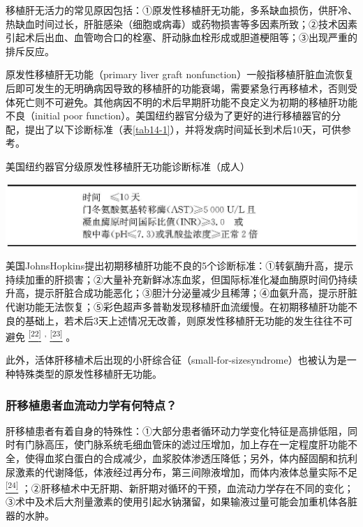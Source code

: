 移植肝无活力的常见原因包括：①原发性移植肝无功能，多系缺血损伤，供肝冷、热缺血时间过长，肝脏感染（细胞或病毒）或药物损害等多因素所致；②技术因素引起术后出血、血管吻合口的栓塞、肝动脉血栓形成或胆道梗阻等；③出现严重的排斥反应。

原发性移植肝无功能（primary liver graft
nonfunction）一般指移植肝脏血流恢复后即可发生的无明确病因导致的移植肝的功能衰竭，需要紧急行再移植术，否则受体死亡则不可避免。其他病因不明的术后早期肝功能不良定义为初期的移植肝功能不良（initial
poor
function）。美国纽约器官分级为了更好的进行移植器官的分配，提出了以下诊断标准（表\ref{tab14-1}），并将发病时间延长到术后10天，可供参考。

\begin{table}[htbp]
\centering
\caption{美国纽约器官分级原发性移植肝无功能诊断标准（成人）}
\label{tab14-1}
\includegraphics{./images/Image00109.jpg}
\end{table}

美国JohnsHopkins提出初期移植肝功能不良的5个诊断标准：①转氨酶升高，提示持续加重的肝损害；②大量补充新鲜冰冻血浆，但国际标准化凝血酶原时间仍持续升高，提示肝脏合成功能恶化；③胆汁分泌量减少且稀薄；④血氨升高，提示肝脏代谢功能无法恢复；⑤彩色超声多普勒发现移植肝血流缓慢。在初期移植肝功能不良的基础上，若术后3天上述情况无改善，则原发性移植肝无功能的发生往往不可避免
\protect\hyperlink{text00020.htmlux5cux23ch22-19}{\textsuperscript{{[}22{]}}}
\textsuperscript{,}
\protect\hyperlink{text00020.htmlux5cux23ch23-19}{\textsuperscript{{[}23{]}}}
。

此外，活体肝移植术后出现的小肝综合征（small-for-sizesyndrome）也被认为是一种特殊类型的原发性移植肝无功能。

\subsubsection{肝移植患者血流动力学有何特点？}

肝移植患者有着自身的特殊性：①大部分患者循环动力学变化特征是高排低阻，同时有门脉高压，使门脉系统毛细血管床的滤过压增加，加上存在一定程度肝功能不全，使得血浆白蛋白的合成减少，血浆胶体渗透压降低；另外，体内醛固酮和抗利尿激素的代谢降低，体液经过再分布，第三间隙液增加，而体内液体总量实际不足
\protect\hyperlink{text00020.htmlux5cux23ch24-19}{\textsuperscript{{[}24{]}}}
；②肝移植术中无肝期、新肝期对循环的干预，血流动力学存在不同的变化；③术中及术后大剂量激素的使用引起水钠潴留，如果输液过量可能会加重机体各脏器的水肿。

